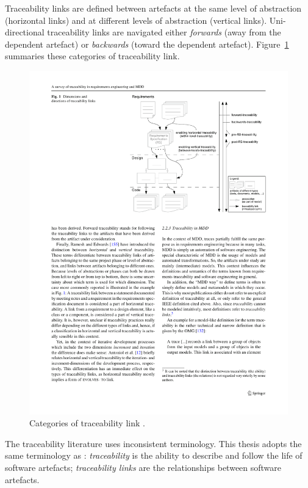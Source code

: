 Traceability links are defined between artefacts at the same level of abstraction (horizontal links) and at different levels of abstraction (vertical links). Uni-directional traceability links are navigated either \emph{forwards} (away from the dependent artefact) or \emph{backwards} (toward the dependent artefact). Figure~\ref{fig:traceability_links} summaries these categories of traceability link.

\begin{figure}[htbp]
  \begin{center}
    \leavevmode
    \includegraphics[width=11.5cm]{3.LiteratureReview/images/traceability_links.pdf}
  \end{center}
  \caption[Categories of traceability link]{Categories of traceability link \cite{winkler09survey}.}
  \label{fig:traceability_links}
\end{figure}

The traceability literature uses inconsistent terminology. This thesis adopts the same terminology as \cite{winkler09survey}: \emph{traceability} is the ability to describe and follow the life of software artefacts; \emph{traceability links} are the relationships between software artefacts.

